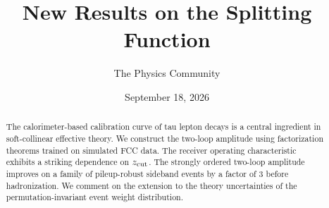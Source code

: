 \documentclass[11pt]{article}
\title{New Results on the Splitting Function}
\author{The Physics Community}
\date{September 18, 2026}
\begin{document}
\maketitle
\begin{abstract}
The calorimeter-based calibration curve of tau lepton decays is a
central ingredient in soft-collinear effective theory. We construct the
two-loop amplitude using factorization theorems trained on simulated FCC
data. The receiver operating characteristic exhibits a striking
dependence on $z_{\rm cut}$. The strongly ordered two-loop amplitude
improves on a family of pileup-robust sideband events by a factor of 3
before hadronization. We comment on the extension to the theory
uncertainties of the permutation-invariant event weight distribution.
\end{abstract}
\tableofcontents




\nocite{*}


\end{document}
